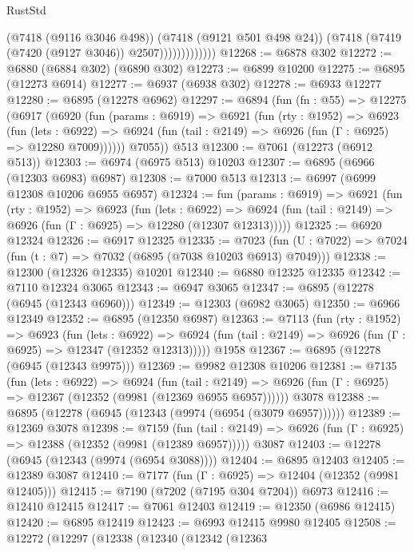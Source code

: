 \begin{lexlean}{RustStd}
\begin{coremodule}
                          (@7418 (@9116 @3046 @498))
                          (@7418 (@9121 @501 @498 @24))
                          (@7418 (@7419 (@7420 (@9127 @3046)) @2507)))))))))))))
@12268 := @6878 @302
@12272 := @6880 (@6884 @302) (@6890 @302)
@12273 := @6899 @10200
@12275 := @6895 (@12273 @6914)
@12277 := @6937 (@6938 @302)
@12278 := @6933 @12277
@12280 := @6895 (@12278 @6962)
@12297 := @6894
    (fun (fn : @55) =>
    @12275
      (@6917
        (@6920
          (fun (params : @6919) =>
          @6921
            (fun (rty : @1952) =>
            @6923
              (fun (lets : @6922) =>
              @6924 (fun (tail : @2149) => @6926 (fun (Γ : @6925) => @12280 @7009))))))
        @7055))
    @513
@12300 := @7061 (@12273 (@6912 @513))
@12303 := @6974 (@6975 @513) @10203
@12307 := @6895 (@6966 (@12303 @6983) @6987)
@12308 := @7000 @513
@12313 := @6997 (@6999 @12308 @10206 @6955 @6957)
@12324 := fun (params : @6919) =>
  @6921
    (fun (rty : @1952) =>
    @6923
      (fun (lets : @6922) =>
      @6924 (fun (tail : @2149) => @6926 (fun (Γ : @6925) => @12280 (@12307 @12313)))))
@12325 := @6920 @12324
@12326 := @6917 @12325
@12335 := @7023
    (fun (U : @7022) => @7024 (fun (t : @7) => @7032 (@6895 (@7038 @10203 @6913) @7049)))
@12338 := @12300 (@12326 @12335) @10201
@12340 := @6880 @12325 @12335
@12342 := @7110 @12324 @3065
@12343 := @6947 @3065
@12347 := @6895 (@12278 (@6945 (@12343 @6960)))
@12349 := @12303 (@6982 @3065)
@12350 := @6966 @12349
@12352 := @6895 (@12350 @6987)
@12363 := @7113
    (fun (rty : @1952) =>
    @6923
      (fun (lets : @6922) =>
      @6924 (fun (tail : @2149) => @6926 (fun (Γ : @6925) => @12347 (@12352 @12313)))))
    @1958
@12367 := @6895 (@12278 (@6945 (@12343 @9975)))
@12369 := @9982 @12308 @10206
@12381 := @7135
    (fun (lets : @6922) =>
    @6924
      (fun (tail : @2149) =>
      @6926 (fun (Γ : @6925) => @12367 (@12352 (@9981 (@12369 @6955 @6957))))))
    @3078
@12388 := @6895 (@12278 (@6945 (@12343 (@9974 (@6954 (@3079 @6957))))))
@12389 := @12369 @3078
@12398 := @7159
    (fun (tail : @2149) => @6926 (fun (Γ : @6925) => @12388 (@12352 (@9981 (@12389 @6957)))))
    @3087
@12403 := @12278 (@6945 (@12343 (@9974 (@6954 @3088))))
@12404 := @6895 @12403
@12405 := @12389 @3087
@12410 := @7177 (fun (Γ : @6925) => @12404 (@12352 (@9981 @12405)))
@12415 := @7190 (@7202 (@7195 @304 @7204)) @6973
@12416 := @12410 @12415
@12417 := @7061 @12403
@12419 := @12350 (@6986 @12415)
@12420 := @6895 @12419
@12423 := @6993 @12415 @9980 @12405
@12508 := @12272
    (@12297
      (@12338
        (@12340
          (@12342
            (@12363

\end{coremodule}
\end{lexlean}
